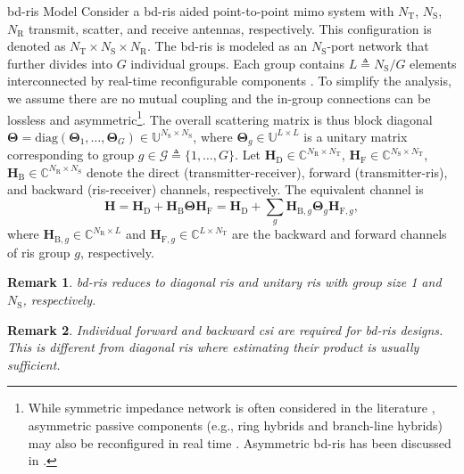 \documentclass[journal]{IEEEtran}
\newtheorem{remark}{Remark}
\begin{document}
\begin{section}{\gls{bd}-\gls{ris} Model}
	Consider a \gls{bd}-\gls{ris} aided point-to-point \gls{mimo} system with $N_\mathrm{T}$, $N_\mathrm{S}$, $N_\mathrm{R}$ transmit, scatter, and receive antennas, respectively.
	This configuration is denoted as $N_\mathrm{T} \times N_\mathrm{S} \times N_\mathrm{R}$.
	The \gls{bd}-\gls{ris} is modeled as an $N_\mathrm{S}$-port network \cite{Ivrlac2010} that further divides into $G$ individual groups.
	Each group contains $L \triangleq N_\mathrm{S} / G$ elements interconnected by real-time reconfigurable components \cite{Shen2020a}.
	To simplify the analysis, we assume there are no mutual coupling and the in-group connections can be lossless and asymmetric\footnote{While symmetric impedance network is often considered in the literature \cite{Shen2020a,Nerini2023,Santamaria2023,Fang2023,Nerini2023a,Zhou2023,Li2023d,Bartoli2023}, asymmetric passive components (e.g., ring hybrids and branch-line hybrids) may also be reconfigured in real time \cite{Ahn2006}. Asymmetric \gls{bd}-\gls{ris} has been discussed in \cite{Li2023b,Li2023c,Bartoli2023}.}.
	The overall scattering matrix is thus block diagonal $\mathbf{\Theta} = \mathrm{diag}(\mathbf{\Theta}_1,\ldots,\mathbf{\Theta}_G) \in \mathbb{U}^{N_\mathrm{S} \times N_\mathrm{S}}$, where $\mathbf{\Theta}_g \in \mathbb{U}^{L \times L}$ is a unitary matrix corresponding to group $g \in \mathcal{G} \triangleq \{1,\ldots,G\}$.
	Let $\mathbf{H}_\mathrm{D} \in \mathbb{C}^{N_\mathrm{R} \times N_\mathrm{T}}$, $\mathbf{H}_\mathrm{F} \in \mathbb{C}^{N_\mathrm{S} \times N_\mathrm{T}}$, $\mathbf{H}_\mathrm{B} \in \mathbb{C}^{N_\mathrm{R} \times N_\mathrm{S}}$ denote the direct (transmitter-receiver), forward (transmitter-\gls{ris}), and backward (\gls{ris}-receiver) channels, respectively.
	The equivalent channel is
	\begin{equation}
		\mathbf{H} = \mathbf{H}_\mathrm{D} + \mathbf{H}_\mathrm{B} \mathbf{\Theta} \mathbf{H}_\mathrm{F} = \mathbf{H}_\mathrm{D} + \sum_g \mathbf{H}_{\mathrm{B},g} \mathbf{\Theta}_g \mathbf{H}_{\mathrm{F},g},
		\label{eq:channel_equivalent}
	\end{equation}
	where $\mathbf{H}_{\mathrm{B},g} \in \mathbb{C}^{N_\mathrm{R} \times L}$ and $\mathbf{H}_{\mathrm{F},g} \in \mathbb{C}^{L \times N_\mathrm{T}}$ are the backward and forward channels of \gls{ris} group $g$, respectively.
	\begin{remark}
		\gls{bd}-\gls{ris} reduces to diagonal \gls{ris} and unitary \gls{ris} with group size 1 and $N_\mathrm{S}$, respectively.
	\end{remark}
	\begin{remark}
		Individual forward and backward \gls{csi} are required for \gls{bd}-\gls{ris} designs.
		This is different from diagonal \gls{ris} where estimating their product is usually sufficient.
	\end{remark}
\end{section}
\end{document}
